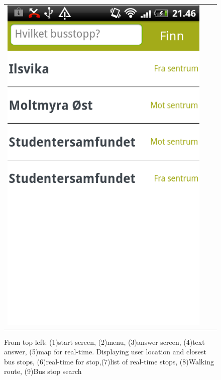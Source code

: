 \begin{figure}
\begin{tabular}{ccc}
\includegraphics[width=0.27\linewidth]{Results/other.png}\\
\end{tabular}
\caption{From top left: (1)start screen, (2)menu, (3)answer screen, (4)text answer, (5)map for real-time. Displaying user location and closest bus stops, (6)real-time for stop,(7)list of real-time stops, (8)Walking route, (9)Bus stop search}
\end{figure}





